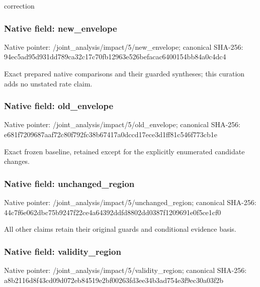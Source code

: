 \documentclass[10pt,a4paper]{article}
\begin{document}
\begingroup\raggedright\sloppy correction\par\endgroup

\subsubsection{Native field: new\_\allowbreak{}envelope}
Native pointer: /joint\_\allowbreak{}analysis/impact/5/new\_\allowbreak{}envelope; canonical SHA-256: 94ec5ad95d931dd789ca32c17c70fb12963e526befacac6400154bb84a0c4dc4

\begingroup\raggedright\sloppy Exact prepared native comparisons and their guarded syntheses;\allowbreak{} this curation adds no unstated rate claim.\par\endgroup

\subsubsection{Native field: old\_\allowbreak{}envelope}
Native pointer: /joint\_\allowbreak{}analysis/impact/5/old\_\allowbreak{}envelope; canonical SHA-256: e681f7209687aaf72c80f792fc38b67417a0dccd17ece3d1ff81c546f773cb1e

\begingroup\raggedright\sloppy Exact frozen baseline,\allowbreak{} retained except for the explicitly enumerated candidate changes.\par\endgroup

\subsubsection{Native field: unchanged\_\allowbreak{}region}
Native pointer: /joint\_\allowbreak{}analysis/impact/5/unchanged\_\allowbreak{}region; canonical SHA-256: 44c7f6e062dbc75b9247f22ce4a64392ddfd8802dd0387f1209691e0f5ce1cf0

\begingroup\raggedright\sloppy All other claims retain their original guards and conditional evidence basis.\par\endgroup

\subsubsection{Native field: validity\_\allowbreak{}region}
Native pointer: /joint\_\allowbreak{}analysis/impact/5/validity\_\allowbreak{}region; canonical SHA-256: a8b2116d8f43cd09d072eb84519e2bf00263fd3ee34b3ad754e3f9ec30a03f2b
\end{document}

